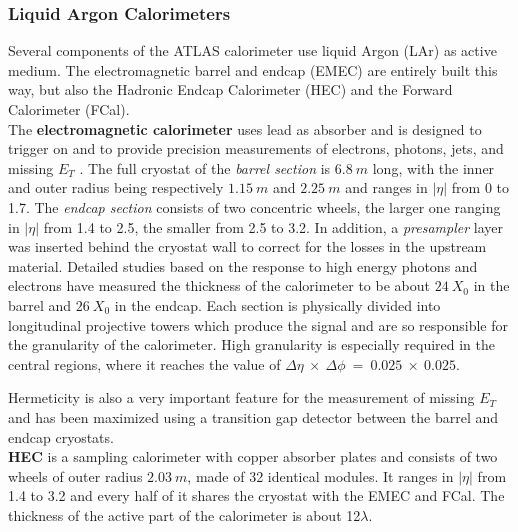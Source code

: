 \documentclass[a4paper,twoside,12pt]{article}
\begin{document}
\subsubsection*{Liquid Argon Calorimeters}\label{sec:LAr}
Several components of the ATLAS calorimeter use liquid Argon (LAr) as active medium\cite{current_EMCal}. The electromagnetic barrel and endcap (EMEC) are entirely built this way, but also the Hadronic Endcap Calorimeter (HEC) and the Forward Calorimeter (FCal). \\[2pt]
The \textbf{electromagnetic calorimeter} uses lead as absorber and is designed to trigger on and to provide precision measurements of electrons, photons, jets, and missing $E_T$ .
The full cryostat of the \textit{barrel section} is $6.8\ m$ long, with the inner and outer radius being respectively $1.15\ m$ and $2.25\ m$ and ranges in $|\eta|$ from 0 to 1.7.  The \textit{endcap section} consists of two concentric wheels, the larger one ranging in $|\eta|$ from 1.4 to 2.5, the smaller from 2.5 to 3.2. In addition, a \textit{presampler} layer was inserted behind the cryostat wall to correct for the losses in the upstream material. 
Detailed studies based on the response to high energy photons and electrons have
measured the thickness of the calorimeter to be about $24\ X_0$ in the barrel and $26\ X_0$ in the endcap. Each section is physically divided into longitudinal projective towers which produce the signal and are so responsible
for the granularity of the calorimeter.
High granularity is especially required in the central regions, where it reaches the value of 
$\Delta\eta\ \times\ \Delta\phi\ =\ 0.025\ \times\ 0.025$.

Hermeticity is also a very important feature for the measurement of missing $E_T$ and has been maximized using a transition gap detector between the barrel and endcap cryostats. \\

\textbf{HEC}\cite{hec} is a sampling calorimeter with copper absorber plates and consists of two wheels of outer radius $2.03\ m$, made of 32 identical modules. It ranges in $|\eta|$ from 1.4 to 3.2 and every half of it shares the cryostat with the EMEC and FCal. The thickness of the active part of the calorimeter is about 12$\lambda$.\\
\end{document}
